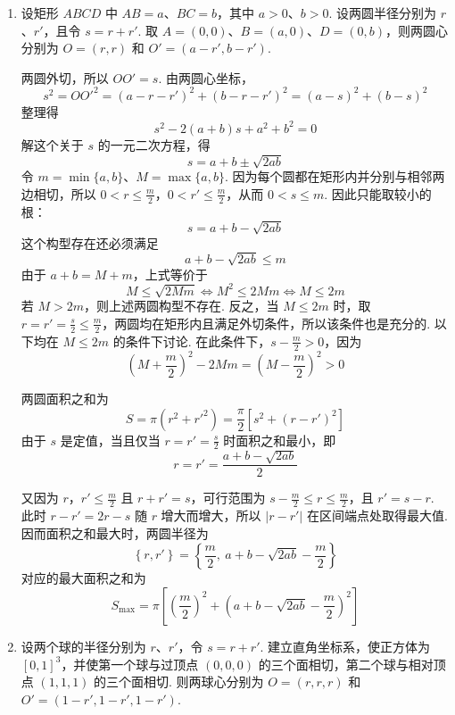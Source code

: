 \documentclass[UTF8,a4paper,oneside,11pt]{ctexbook}
\begin{document}
\begin{solution}
\begin{enumerate}
\item
设矩形 \(ABCD\) 中 \(AB=a\)、\(BC=b\)，其中 \(a>0\)、\(b>0\). 设两圆半径分别为 \(r\)、\(r'\)，且令 \(s=r+r'\). 取 \(A=(0,0)\)、\(B=(a,0)\)、\(D=(0,b)\)，则两圆心分别为 \(O=(r,r)\) 和 \(O'=(a-r',b-r')\).


两圆外切，所以 \(OO'=s\). 由两圆心坐标，
\[
s^2=OO'^2=\left( a-r-r' \right)^2+\left( b-r-r' \right)^2
=\left( a-s \right)^2+\left( b-s \right)^2
\]
整理得
\[
s^2-2\left( a+b \right)s+a^2+b^2=0
\]
解这个关于 \(s\) 的一元二次方程，得
\[
s=a+b\pm\sqrt{2ab}
\]
令 \(m=\min\{a,b\}\)、\(M=\max\{a,b\}\). 因为每个圆都在矩形内并分别与相邻两边相切，所以 \(0<r\le\frac{m}{2}\)，\(0<r'\le\frac{m}{2}\)，从而 \(0<s\le m\). 因此只能取较小的根：
\[
s=a+b-\sqrt{2ab}
\]
这个构型存在还必须满足
\[
a+b-\sqrt{2ab}\le m
\]
由于 \(a+b=M+m\)，上式等价于
\[
M\le\sqrt{2Mm}\iff M^2\le2Mm\iff M\le2m
\]
若 \(M>2m\)，则上述两圆构型不存在. 反之，当 \(M\le2m\) 时，取 \(r=r'=\frac{s}{2}\le\frac m2\)，两圆均在矩形内且满足外切条件，所以该条件也是充分的. 以下均在 \(M\le2m\) 的条件下讨论. 在此条件下，\(s-\frac m2>0\)，因为
\[
\left( M+\frac m2 \right)^2-2Mm=\left( M-\frac m2 \right)^2>0
\]

两圆面积之和为
\[
S=\pi\left( r^2+r'^2 \right)=\frac{\pi}{2}\left[ s^2+\left( r-r' \right)^2 \right]
\]
由于 \(s\) 是定值，当且仅当 \(r=r'=\frac{s}{2}\) 时面积之和最小，即
\[
r=r'=\frac{a+b-\sqrt{2ab}}{2}
\]

又因为 \(r\)，\(r'\le\frac{m}{2}\) 且 \(r+r'=s\)，可行范围为 \(s-\frac m2\le r\le\frac m2\)，且 \(r'=s-r\). 此时 \(r-r'=2r-s\) 随 \(r\) 增大而增大，所以 \(\lvert r-r'\rvert\) 在区间端点处取得最大值. 因而面积之和最大时，两圆半径为
\[
\left\{r,r'\right\}=\left\{\frac{m}{2},\ a+b-\sqrt{2ab}-\frac{m}{2}\right\}
\]
对应的最大面积之和为
\[
S_{\max}=\pi\left[\left( \frac{m}{2} \right)^2+\left( a+b-\sqrt{2ab}-\frac{m}{2} \right)^2\right]
\]

\item
设两个球的半径分别为 \(r\)、\(r'\)，令 \(s=r+r'\). 建立直角坐标系，使正方体为 \([0,1]^3\)，并使第一个球与过顶点 \((0,0,0)\) 的三个面相切，第二个球与相对顶点 \((1,1,1)\) 的三个面相切. 则两球心分别为 \(O=(r,r,r)\) 和 \(O'=(1-r',1-r',1-r')\).



\end{enumerate}
\end{solution}
\end{document}
